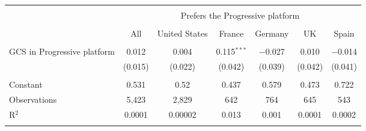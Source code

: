 
\begin{tabular}{@{\extracolsep{5pt}}lcccccc} 
\\[-1.8ex]\hline 
\hline \\[-1.8ex] 
 & \multicolumn{6}{c}{Prefers the Progressive platform} \\ 
\cline{2-7} 
\\[-1.8ex] & All & United States & France & Germany & UK & Spain \\ 
\hline \\[-1.8ex] 
 GCS in Progressive platform & 0.012 & 0.004 & 0.115$^{***}$ & $-$0.027 & 0.010 & $-$0.014 \\ 
  & (0.015) & (0.022) & (0.042) & (0.039) & (0.042) & (0.041) \\ 
 \hline \\[-1.8ex] 
Constant & 0.531 & 0.52 & 0.437 & 0.579 & 0.473 & 0.722 \\ 
Observations & 5,423 & 2,829 & 642 & 764 & 645 & 543 \\ 
R$^{2}$ & 0.0001 & 0.00002 & 0.013 & 0.001 & 0.0001 & 0.0002 \\ 
\hline 
\hline \\[-1.8ex] 
\end{tabular} 
